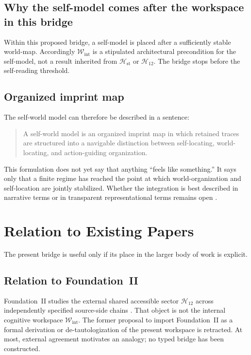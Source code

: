 \documentclass[12pt,a4paper]{article}
\begin{document}
\subsection{Why the self-model comes after the workspace in this bridge}

Within this proposed bridge, a self-model is placed after a sufficiently
stable world-map. Accordingly \(\mathcal W_{\mathrm{int}}\) is a
stipulated architectural precondition for the self-model, not a result
inherited from \(\mathcal H_{\mathrm{st}}\) or \(\mathcal H_{12}\). The
bridge stops before the self-reading threshold.

\subsection{Organized imprint map}

The self-world model can therefore be described in a sentence:

\begin{quote}
A self-world model is an organized imprint map in which retained traces are structured into a navigable distinction between self-locating, world-locating, and action-guiding organization.
\end{quote}

This formulation does not yet say that anything ``feels like something.'' It says only that a finite regime has reached the point at which world-organization and self-location are jointly stabilized. Whether the integration is best described in narrative terms or in transparent representational terms remains open \cite{Dennett1992,Metzinger2003}.

\section{Relation to Existing Papers}

The present bridge is useful only if its place in the larger body of work is explicit.

\subsection{Relation to Foundation~II}

Foundation~II studies the external shared accessible sector
\(\mathcal H_{12}\) across independently specified source-side chains
\cite{FoundationII}. That object is not the internal cognitive workspace
\(\mathcal W_{\mathrm{int}}\). The former proposal to import
Foundation~II as a formal derivation or de-tautologization of the present
workspace is retracted. At most, external agreement motivates an analogy;
no typed bridge has been constructed.
\end{document}
